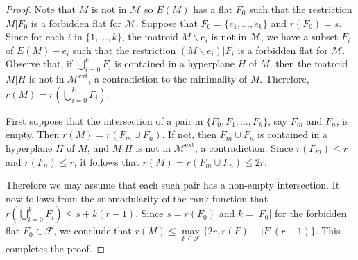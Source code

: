 \documentclass[10pt,a4paper]{amsart}
\newcommand\Me{\mathcal{M}^\mathrm{ext}}
\newcommand\ba{\backslash}
\begin{document}
\begin{proof}
Note that $M$ is not in $\mathcal{M}$ so $E(M)$ has a flat $F_0$ such that the restriction $M|F_0$ is a forbidden flat for $\mathcal{M}$. Suppose that $F_0 = \{e_1, \ldots, e_k\}$ and $r(F_0) = s$. Since for each $i$ in $\{1, \ldots, k\}$, the matroid $M \ba e_i$ is not in $\mathcal{M}$, we have a subset $F_i$ of $E(M)-e_i$ such that the restriction $(M \ba e_i)|F_i$ is a forbidden flat for $\mathcal{M}$. Observe that, if $\bigcup_{i=0}^{k} F_i$ is contained in a hyperplane $H$ of $M$, then the matroid $M|H$ is not in $\Me$, a contradiction to the minimality of $M$. Therefore, $r(M) = r(\bigcup_{i=0}^{k} F_i)$.

First suppose that the intersection of a pair in $\{F_0, F_1, \ldots, F_k\}$, say $F_m$ and $F_n$, is empty. Then $r(M)=r(F_m \cup F_n)$. If not, then $F_m \cup F_n$ is contained in a hyperplane $H$ of $M$, and $M|H$ is not in $\Me$, a contradiction. Since $r(F_m) \leq r$ and $r(F_n) \leq r$, it follows that $r(M) = r(F_m\cup F_n) \leq 2r$. 

Therefore we may assume that each such pair has a non-empty intersection. It now follows from the submodularity of the rank function that $r(\bigcup_{i=0}^{k} F_i) \leq s + k(r-1)$. Since $s = r(F_0)$ and $k = |F_0|$ for the forbidden flat $F_0 \in \mathcal{F}$, we conclude that $r(M) \leq \max\limits_{F \in \mathcal{F}} \{2r, r(F) + |F|(r-1)\}$. This completes the proof.
\end{proof}
\end{document}
